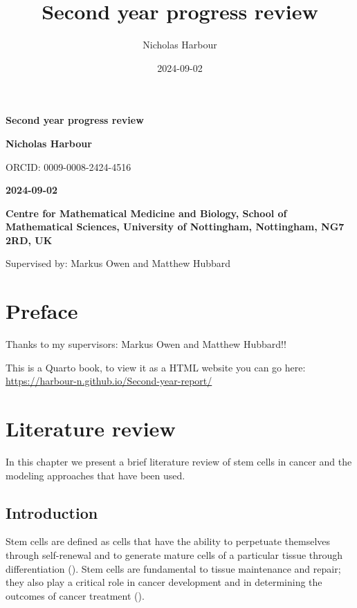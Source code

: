 \documentclass[
  letterpaper,
]{scrreprt}
\title{Second year progress review}
\author{Nicholas Harbour}
\date{2024-09-02}
\renewcommand*\contentsname{Table of contents}
\newcommand\contentsname{Table of contents}
\theoremstyle{definition}
\theoremstyle{remark}
\begin{document}
\cleardoublepage
\thispagestyle{empty}
{\centering
{\Huge\bfseries Second year progress review \par}
\vspace{12ex}
{\Large\bfseries Nicholas Harbour \par}
\vspace{3ex}
{\Large ORCID: 0009-0008-2424-4516 \par}
{\bfseries\large 2024-09-02 \par}
\vspace{12ex}
%
%
{\bfseries\large Centre for Mathematical Medicine and Biology, School of
Mathematical Sciences, University of Nottingham, Nottingham, NG7 2RD,
UK \par}
%
\vspace{12ex}
{\small Supervised by: Markus Owen and Matthew Hubbard\par}
}

\renewcommand*\contentsname{Table of contents}
{
\hypersetup{linkcolor=}
\setcounter{tocdepth}{2}
\tableofcontents
}


\chapter*{Preface}\label{preface}


Thanks to my supervisors: Markus Owen and Matthew Hubbard!!

This is a Quarto book, to view it as a HTML website you can go here:
\url{https://harbour-n.github.io/Second-year-report/}


\chapter{Literature review}\label{sec-lit-review}

In this chapter we present a brief literature review of stem cells in
cancer and the modeling approaches that have been used.

\section{Introduction}\label{sec-introduction}

Stem cells are defined as cells that have the ability to perpetuate
themselves through self-renewal and to generate mature cells of a
particular tissue through differentiation (). Stem cells are fundamental to tissue maintenance and
repair; they also play a critical role in cancer development and in
determining the outcomes of cancer treatment
().
\end{document}
